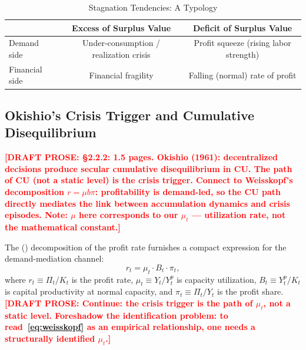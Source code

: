 \documentclass[12pt,letterpaper]{article}
\newcommand{\mut}{\mu_t}           %
\newcommand{\Yp}{Y^p_t}            %
\newcommand{\pit}{\pi_t}           %
\newcommand{\Bt}{B_t}              %
\newcommand{\draftnote}[1]{%
  \textcolor{red}{\textbf{[DRAFT PROSE: #1]}}}
\begin{document}
\begin{table}[h]
  \centering
  \caption{Stagnation Tendencies: A Typology}
  \label{tab:typology}
  \begin{tabular}{lcc}
    \toprule
     & Excess of Surplus Value & Deficit of Surplus Value \\
    \midrule
    Demand side     & Under-consumption / realization crisis
                    & Profit squeeze (rising labor strength) \\
    Financial side  & Financial fragility
                    & Falling (normal) rate of profit \\
    \bottomrule
  \end{tabular}
  \bigskip

\end{table}


\subsection{Okishio's Crisis Trigger and Cumulative Disequilibrium}
\label{sec:okishio}

\draftnote{§2.2.2: 1.5 pages. Okishio (1961): decentralized decisions produce
  secular cumulative disequilibrium in CU. The path of CU (not a static level)
  is the crisis trigger. Connect to Weisskopf's decomposition
  $r = \mu b \pi$: profitability is demand-led, so the CU path directly
  mediates the link between accumulation dynamics and crisis episodes.
  Note: $\mu$ here corresponds to our $\mut$ — utilization rate, not
  the mathematical constant.}

The \citeauthor{weisskopf1979} (\citeyear{weisskopf1979}) decomposition of
the profit rate furnishes a compact expression for the demand-mediation channel:
\begin{equation}
  r_t = \mut \cdot \Bt \cdot \pit,
  \label{eq:weisskopf}
\end{equation}
where $r_t \equiv \Pi_t/K_t$ is the profit rate, $\mut \equiv Y_t/\Yp$ is
capacity utilization, $\Bt \equiv \Yp/K_t$ is capital productivity at normal
capacity, and $\pit \equiv \Pi_t/Y_t$ is the profit share.
\draftnote{Continue: the crisis trigger is the path of $\mut$, not a static
  level. Foreshadow the identification problem: to read~\eqref{eq:weisskopf}
  as an empirical relationship, one needs a structurally identified $\mut$.}
\end{document}
